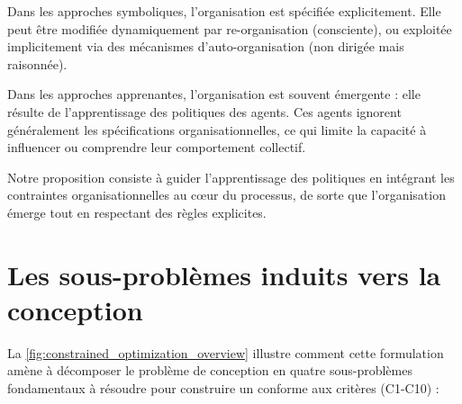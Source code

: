 Dans les approches symboliques, l'organisation est spécifiée explicitement. Elle peut être modifiée dynamiquement par re-organisation (consciente), ou exploitée implicitement via des mécanismes d'auto-organisation (non dirigée mais raisonnée).

Dans les approches apprenantes, l'organisation est souvent émergente : elle résulte de l'apprentissage des politiques des agents. Ces agents ignorent généralement les spécifications organisationnelles, ce qui limite la capacité à influencer ou comprendre leur comportement collectif.

Notre proposition consiste à guider l'apprentissage des politiques en intégrant les contraintes organisationnelles au cœur du processus, de sorte que l'organisation émerge tout en respectant des règles explicites.


\section{Les sous-problèmes induits vers la conception}

La \autoref{fig:constrained_optimization_overview} illustre comment cette formulation amène à décomposer le problème de conception en quatre sous-problèmes fondamentaux à résoudre pour construire un  conforme aux critères (C1-C10) :

